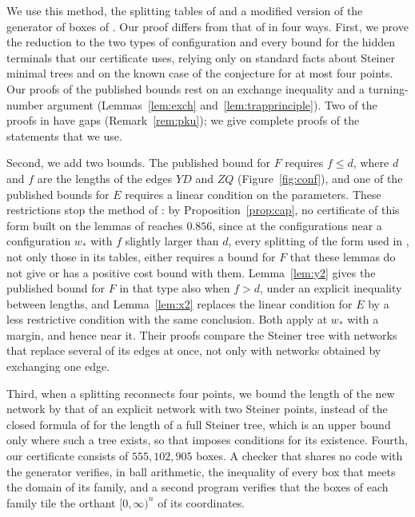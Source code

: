 \documentclass[11pt]{amsart}
\theoremstyle{definition}
\theoremstyle{remark}
\numberwithin{equation}{section}
\newcommand{\NREC}{555{,}102{,}905}
\newcommand{\CAPSTAR}{0.856}
\begin{document}
We use this method, the splitting tables of \cite{KHSHGW} and a modified version of the generator of boxes of \cite{KHSHGW}. Our proof differs from that of \cite{KHSHGW} in four ways. First, we prove the reduction to the two types of configuration and every bound for the hidden terminals that our certificate uses, relying only on standard facts about Steiner minimal trees and on the known case of the conjecture for at most four points. Our proofs of the published bounds rest on an exchange inequality and a turning-number argument (Lemmas~\ref{lem:exch} and~\ref{lem:trapprinciple}). Two of the proofs in \cite{KHSHGW} have gaps (Remark~\ref{rem:pku}); we give complete proofs of the statements that we use.

Second, we add two bounds. The published bound for $F$ requires $f\le d$, where $d$ and $f$ are the lengths of the edges $YD$ and $ZQ$ (Figure~\ref{fig:conf}), and one of the published bounds for $E$ requires a linear condition on the parameters. These restrictions stop the method of \cite{KHSHGW}: by Proposition~\ref{prop:cap}, no certificate of this form built on the lemmas of \cite{KHSHGW} reaches $\CAPSTAR$, since at the configurations near a configuration $w_*$ with $f$ slightly larger than $d$, every splitting of the form used in \cite{KHSHGW}, not only those in its tables, either requires a bound for $F$ that these lemmas do not give or has a positive cost bound with them. Lemma~\ref{lem:y2} gives the published bound for $F$ in that type also when $f>d$, under an explicit inequality between lengths, and Lemma~\ref{lem:x2} replaces the linear condition for $E$ by a less restrictive condition with the same conclusion. Both apply at $w_*$ with a margin, and hence near it. Their proofs compare the Steiner tree with networks that replace several of its edges at once, not only with networks obtained by exchanging one edge.

Third, when a splitting reconnects four points, we bound the length of the new network by that of an explicit network with two Steiner points, instead of the closed formula of \cite{KHSHGW} for the length of a full Steiner tree, which is an upper bound only where such a tree exists, so that \cite{KHSHGW} imposes conditions for its existence. Fourth, our certificate consists of $\NREC$ boxes. A checker that shares no code with the generator verifies, in ball arithmetic, the inequality of every box that meets the domain of its family, and a second program verifies that the boxes of each family tile the orthant $[0,\infty)^n$ of its coordinates.
\end{document}
